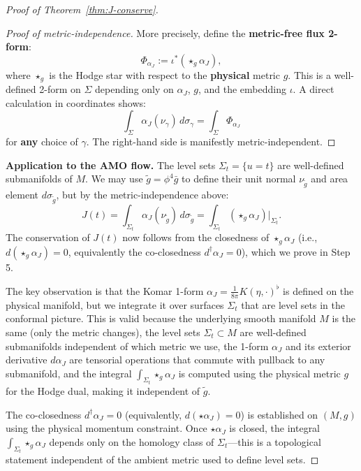 \documentclass[10pt,a4paper]{amsart}
\newcommand{\bg}{\bar{g}}
\newcommand{\tg}{\tilde{g}}
\begin{document}
\begin{proof}[Proof of Theorem~\ref{thm:J-conserve}]
\begin{proof}[Proof of metric-independence]
More precisely, define the \textbf{metric-free flux 2-form}:
\[
\Phi_{\alpha_J} := \iota^*(\star_g \alpha_J),
\]
where $\star_g$ is the Hodge star with respect to the \textbf{physical} metric $g$. This is a well-defined 2-form on $\Sigma$ depending only on $\alpha_J$, $g$, and the embedding $\iota$. A direct calculation in coordinates shows:
\[
\int_\Sigma \alpha_J(\nu_\gamma) \, d\sigma_\gamma = \int_\Sigma \Phi_{\alpha_J}
\]
for \textbf{any} choice of $\gamma$. The right-hand side is manifestly metric-independent.
\end{proof}

\textbf{Application to the AMO flow.} The level sets $\Sigma_t = \{u = t\}$ are well-defined submanifolds of $M$. We may use $\tg = \phi^4 \bg$ to define their unit normal $\nu_{\tg}$ and area element $d\sigma_{\tg}$, but by the metric-independence above:
\[
J(t) = \int_{\Sigma_t} \alpha_J(\nu_{\tg}) \, d\sigma_{\tg} = \int_{\Sigma_t} (\star_g \alpha_J)|_{\Sigma_t}.
\]
The conservation of $J(t)$ now follows from the closedness of $\star_g \alpha_J$ (i.e., $d(\star_g\alpha_J) = 0$, equivalently the co-closedness $d^\dagger\alpha_J = 0$), which we prove in Step 5.

The key observation is that the Komar 1-form $\alpha_J = \frac{1}{8\pi} K(\eta, \cdot)^\flat$ is defined on the physical manifold, but we integrate it over surfaces $\Sigma_t$ that are level sets in the conformal picture. This is valid because the underlying smooth manifold $M$ is the same (only the metric changes), the level sets $\Sigma_t \subset M$ are well-defined submanifolds independent of which metric we use, the 1-form $\alpha_J$ and its exterior derivative $d\alpha_J$ are tensorial operations that commute with pullback to any submanifold, and the integral $\int_{\Sigma_t} \star_g \alpha_J$ is computed using the physical metric $g$ for the Hodge dual, making it independent of $\tg$.

The co-closedness $d^\dagger\alpha_J = 0$ (equivalently, $d(\star\alpha_J) = 0$) is established on $(M, g)$ using the physical momentum constraint. Once $\star\alpha_J$ is closed, the integral $\int_{\Sigma_t} \star_g \alpha_J$ depends only on the homology class of $\Sigma_t$---this is a topological statement independent of the ambient metric used to define level sets.


\end{proof}
\end{document}
